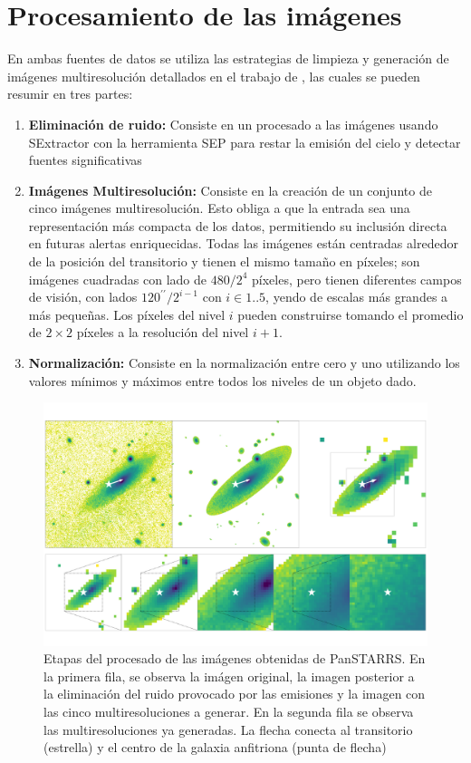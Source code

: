 \documentclass[../tesis.tex]{subfiles}
\begin{document}
\section{Procesamiento de las imágenes}\label{methods:process}
En ambas fuentes de datos se utiliza las estrategias de limpieza y generación de imágenes multiresolución detallados en el trabajo de \cite{delight}, las cuales se pueden resumir en tres partes:\par\null\par

\begin{enumerate}
    \item \textbf{Eliminación de ruido:} Consiste en un procesado a las imágenes usando SExtractor con la herramienta SEP \cite{sex} para restar la emisión del cielo y detectar fuentes significativas
    \item \textbf{Imágenes Multiresolución:} Consiste en la creación de un conjunto de cinco imágenes multiresolución. Esto obliga a que la entrada sea una representación más compacta de los datos, permitiendo su inclusión directa en futuras alertas enriquecidas. Todas las imágenes están centradas alrededor de la posición del transitorio y tienen el mismo tamaño en píxeles; son imágenes cuadradas con lado de $480/2^4$ píxeles, pero tienen diferentes campos de visión, con lados $120^{\prime\prime}/2^{i-1}$ con $i \in 1..5$, yendo de escalas más grandes a más pequeñas. Los píxeles del nivel $i$ pueden construirse tomando el promedio de $2\times2$ píxeles a la resolución del nivel $i + 1$.
    \item \textbf{Normalización:} Consiste en la normalización entre cero y uno utilizando los valores mínimos y máximos entre todos los niveles de un objeto dado.
\end{enumerate}

\begin{figure}[h]
    \centering
    \includegraphics[width=1\linewidth]{images/ZTF19aczjytt_comp.png}
    \caption{Etapas del procesado de las imágenes obtenidas de PanSTARRS. En la primera fila, se observa la imágen original, la imagen posterior a la eliminación del ruido provocado por las emisiones y la imagen con las cinco multiresoluciones a generar. En la segunda fila se observa las multiresoluciones ya generadas. La flecha conecta al transitorio (estrella) y el centro de la galaxia anfitriona (punta de flecha)}
    \label{fig:process-summarization}
\end{figure}
\end{document}
